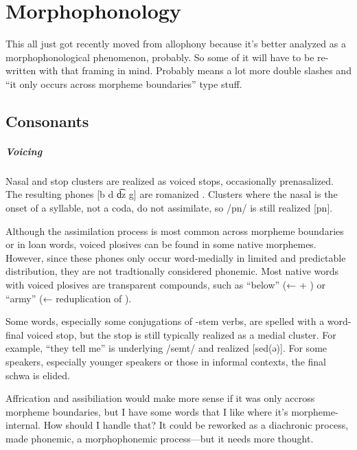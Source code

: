\setchapterpreamble[u]{\margintoc}
\chapter{Morphophonology}
\begin{kaobox}[frametitle=\sc todo:]
This all just got recently moved from allophony because it's better analyzed as a morphophonological phenomenon, probably. So some of it will have to be re-written with that framing in mind. Probably means a lot more double slashes and “it only occurs across morpheme boundaries” type stuff.
\end{kaobox}
\section{Consonants} \label{sec:conso_morphono}
\paragraph{Voicing}
Nasal and stop clusters are realized as voiced stops, occasionally prenasalized. The resulting phones [b d d͡z g] are romanized .  Clusters where the nasal is the onset of a syllable, not a coda, do not assimilate, so /pn/ is still realized [pn]. 

Although the assimilation process is most common across morpheme boundaries or in loan words, voiced plosives can be found in some native morphemes. However, since these phones only occur word-medially in limited and predictable distribution, they are not tradtionally considered phonemic.  Most native words with voiced plosives are transparent compounds, such as  “below” (←  + ) or  “army” (← reduplication of ).

Some words, especially some conjugations of -stem verbs, are spelled with a word-final voiced stop, but the stop is still typically realized as a medial cluster. For example,  “they tell me” is underlying /semt/ and realized [sed(ə)]. For some speakers, especially younger speakers or those in informal contexts, the final schwa is elided.

\begin{kaobox}[frametitle=\sc todo:]
Affrication and assibiliation would make more sense if it was only accross morpheme boundaries, but I have some words that I like where it's morpheme-internal. How should I handle that? It could be reworked as a diachronic process, made phonemic, a morphophonemic process---but it needs more thought.
\end{kaobox}

